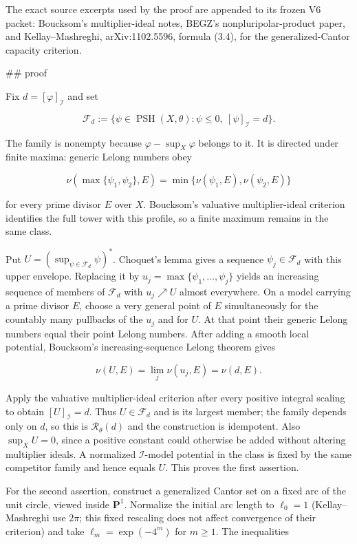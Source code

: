 The exact source excerpts used by the proof are appended to its frozen V6
packet: Boucksom's multiplier-ideal notes, BEGZ's nonpluripolar-product
paper, and Kellay--Mashreghi, arXiv:1102.5596, formula (3.4), for the
generalized-Cantor capacity criterion.

## proof

Fix $d=[\varphi]_{\mathcal I}$ and set

$$
\mathcal F_d:=\{\psi\in\operatorname{PSH}(X,\theta):
  \psi\le0,\ [\psi]_{\mathcal I}=d\}.
$$

The family is nonempty because $\varphi-\sup_X\varphi$ belongs to it. It is
directed under finite maxima: generic Lelong numbers obey

$$
\nu(\max\{\psi_1,\psi_2\},E)=
\min\{\nu(\psi_1,E),\nu(\psi_2,E)\}
$$

for every prime divisor $E$ over $X$. Boucksom's valuative
multiplier-ideal criterion identifies the full tower with this profile, so a
finite maximum remains in the same class.

Put $U=(\sup_{\psi\in\mathcal F_d}\psi)^*$. Choquet's lemma gives a
sequence $\psi_j\in\mathcal F_d$ with this upper envelope. Replacing it by
$u_j=\max\{\psi_1,\ldots,\psi_j\}$ yields an increasing sequence of members
of $\mathcal F_d$ with $u_j\nearrow U$ almost everywhere. On a model carrying
a prime divisor $E$, choose a very general point of $E$ simultaneously for
the countably many pullbacks of the $u_j$ and for $U$. At that point their
generic Lelong numbers equal their point Lelong numbers. After adding a
smooth local potential, Boucksom's increasing-sequence Lelong theorem gives

$$
\nu(U,E)=\lim_j\nu(u_j,E)=\nu(d,E).
$$

Apply the valuative multiplier-ideal criterion after every positive integral
scaling to obtain $[U]_{\mathcal I}=d$. Thus $U\in\mathcal F_d$ and is its
largest member; the family depends only on $d$, so this is
$\mathcal R_\theta(d)$ and the construction is idempotent. Also
$\sup_X U=0$, since a positive constant could otherwise be added without
altering multiplier ideals. A normalized $\mathcal I$-model potential in the
class is fixed by the same competitor family and hence equals $U$. This
proves the first assertion.

For the second assertion, construct a generalized Cantor set on a fixed
arc of the unit circle, viewed inside $\mathbf P^1$. Normalize the initial
arc length to $\ell_0=1$ (Kellay--Mashreghi use $2\pi$; this fixed rescaling
does not affect convergence of their criterion) and take
$\ell_m=\exp(-4^m)$ for $m\ge1$. The inequalities

